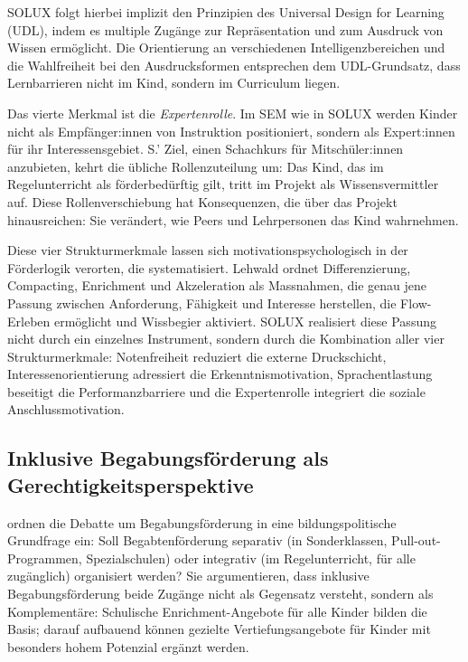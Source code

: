 \documentclass[ngerman, a4paper]{article}
\begin{document}
SOLUX folgt hierbei implizit den Prinzipien des Universal Design for Learning
(UDL), indem es multiple Zugänge zur Repräsentation und zum Ausdruck von Wissen
ermöglicht. Die Orientierung an verschiedenen Intelligenzbereichen und die
Wahlfreiheit bei den Ausdrucksformen entsprechen dem UDL-Grundsatz, dass
Lernbarrieren nicht im Kind, sondern im Curriculum liegen.

Das vierte Merkmal ist die \textit{Expertenrolle}. Im SEM wie in SOLUX werden Kinder
nicht als Empfänger:innen von Instruktion positioniert, sondern als Expert:innen
für ihr Interessensgebiet. S.' Ziel, einen Schachkurs für Mitschüler:innen
anzubieten, kehrt die übliche Rollenzuteilung um: Das Kind, das im Regelunterricht
als förderbedürftig gilt, tritt im Projekt als Wissensvermittler auf. Diese
Rollenverschiebung hat Konsequenzen, die über das Projekt hinausreichen: Sie
verändert, wie Peers und Lehrpersonen das Kind wahrnehmen.

Diese vier Strukturmerkmale lassen sich motivationspsychologisch in der
Förderlogik verorten, die \textcite[S.\,151--158]{lehwald2017motivation}
systematisiert. Lehwald ordnet Differenzierung, Compacting, Enrichment und
Akzeleration als Massnahmen, die genau jene Passung zwischen Anforderung,
Fähigkeit und Interesse herstellen, die Flow-Erleben ermöglicht und Wissbegier
aktiviert. SOLUX realisiert diese Passung nicht durch ein einzelnes Instrument,
sondern durch die Kombination aller vier Strukturmerkmale: Notenfreiheit
reduziert die externe Druckschicht, Interessenorientierung adressiert die
Erkenntnismotivation, Sprachentlastung beseitigt die Performanzbarriere und
die Expertenrolle integriert die soziale Anschlussmotivation.

\subsection{Inklusive Begabungsförderung als Gerechtigkeitsperspektive}

\textcite{weigand2021separativ} ordnen die Debatte um Begabungsförderung in eine bildungspolitische
Grundfrage ein: Soll Begabtenförderung separativ (in Sonderklassen, Pull-out-Programmen,
Spezialschulen) oder integrativ (im Regelunterricht, für alle zugänglich) organisiert
werden? Sie argumentieren, dass inklusive Begabungsförderung beide Zugänge nicht als
Gegensatz versteht, sondern als Komplementäre: Schulische Enrichment-Angebote für alle
Kinder bilden die Basis; darauf aufbauend können gezielte Vertiefungsangebote für
Kinder mit besonders hohem Potenzial ergänzt werden.
\end{document}
